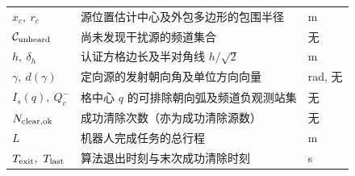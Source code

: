 \begin{longtable}{lll}
        $\hat x_c,\ r_c$     & 源位置估计中心及外包多边形的包围半径 & m \\
        $\mathcal C_{\rm unheard}$ & 尚未发现干扰源的频道集合 & 无 \\
        $h,\ \delta_h$       & 认证方格边长及半对角线 $h/\sqrt2$ & m \\
        $\gamma,\ d(\gamma)$ & 定向源的发射朝向角及单位方向向量 & rad, 无 \\
        $I_s(q),\ Q_c^-$     & 格中心 $q$ 的可排除朝向弧及频道负观测站集 & 无 \\
        $N_{\rm clear,ok}$   & 成功清除次数（亦为成功清除源数） & 无 \\
        $L$                 & 机器人完成任务的总行程 & m \\
        $T_{\rm exit},\ T_{\rm last}$ & 算法退出时刻与末次成功清除时刻 & s \\
        \bottomrule
\end{longtable}
